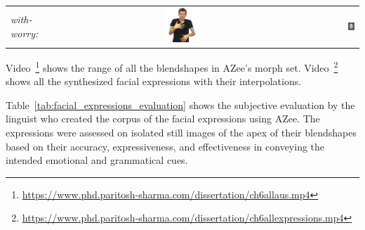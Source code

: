 \documentclass[../../main]{subfiles}
\begin{document}
\begin{longtable}{|l|c|r|}
    \emph{with-worry:} & \includegraphics[width=0.15\textwidth]{chapters/facial_expressions/images/original_facial_expressions/with_worry.png} & \includegraphics[width=0.15\textwidth]{chapters/facial_expressions/images/synthesized_expressions/with_worry.png} \\
\end{longtable}

Video~\footnote{\url{https://www.phd.paritosh-sharma.com/dissertation/ch6allaus.mp4}} shows the range of all the blendshapes in AZee's morph set. Video~\footnote{\url{https://www.phd.paritosh-sharma.com/dissertation/ch6allexpressions.mp4}} shows all the synthesized facial expressions with their interpolations.

Table~\ref{tab:facial_expressions_evaluation} shows the subjective evaluation by the linguist who created the corpus of the facial expressions using AZee. The expressions were assessed on isolated still images of the apex of their blendshapes based on their accuracy, expressiveness, and effectiveness in conveying the intended emotional and grammatical cues.
\end{document}
